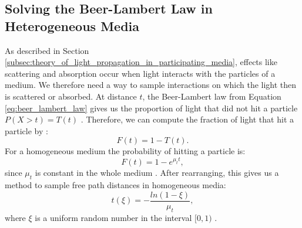 \subsection{Solving the Beer-Lambert Law in Heterogeneous Media}
\label{subsec:solving_beer_lambert_law_in_heterogeneous_media}
As described in Section \ref{subsec:theory_of_light_propagation_in_participating_media}, effects like scattering and absorption occur when light interacts with the particles of a medium.
We therefore need a way to sample interactions on which the light then is scattered or absorbed.
At distance $t$, the Beer-Lambert law from Equation \ref{eq:beer_lambert_law} gives us the proportion of light that did not hit a particle $P(X > t) = T(t)$ \cite{novak_overview}.
Therefore, we can compute the fraction of light that hit a particle by \cite{novak_overview}:
\begin{equation*}
    F(t) = 1 - T(t).
\end{equation*}
For a homogeneous medium the probability of hitting a particle is:
\begin{equation*}
    F(t) = 1 - e^{\mu_t t},
\end{equation*}
since $\mu_t$ is constant in the whole medium \cite{novak_overview}.
After rearranging, this gives us a method to sample free path distances in homogeneous media:
\begin{equation}
    \label{eq:distance_sampling}
    t(\xi) = -\frac{ln(1-\xi)}{\mu_t},
\end{equation}
where $\xi$ is a uniform random number in the interval $[0, 1)$ \cite{novak_overview}.

